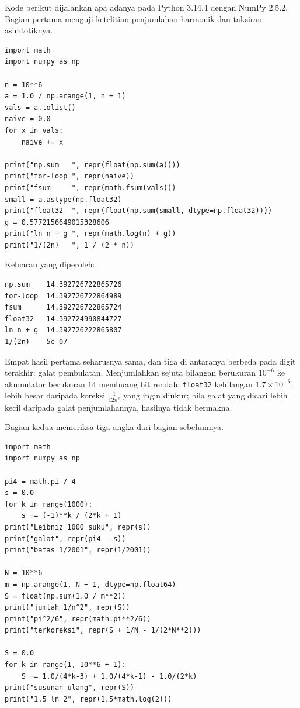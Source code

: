 Kode berikut dijalankan apa adanya pada Python 3.14.4 dengan NumPy 2.5.2. Bagian pertama
menguji ketelitian penjumlahan harmonik dan taksiran asimtotiknya.

\begin{lab}
\begin{verbatim}
import math
import numpy as np

n = 10**6
a = 1.0 / np.arange(1, n + 1)
vals = a.tolist()
naive = 0.0
for x in vals:
    naive += x

print("np.sum   ", repr(float(np.sum(a))))
print("for-loop ", repr(naive))
print("fsum     ", repr(math.fsum(vals)))
small = a.astype(np.float32)
print("float32  ", repr(float(np.sum(small, dtype=np.float32))))
g = 0.5772156649015328606
print("ln n + g ", repr(math.log(n) + g))
print("1/(2n)   ", 1 / (2 * n))
\end{verbatim}
\end{lab}

Keluaran yang diperoleh:
\begin{verbatim}
np.sum    14.392726722865726
for-loop  14.392726722864989
fsum      14.392726722865724
float32   14.392724990844727
ln n + g  14.392726222865807
1/(2n)    5e-07
\end{verbatim}

Empat hasil pertama seharusnya sama, dan tiga di antaranya berbeda pada digit
terakhir: galat pembulatan. Menjumlahkan sejuta bilangan berukuran $10^{-6}$ ke
akumulator berukuran $14$ membuang bit rendah. \texttt{float32} kehilangan
$1.7 \times 10^{-6}$, lebih besar daripada koreksi $\frac{1}{12n^2}$ yang ingin diukur;
bila galat yang dicari lebih kecil daripada galat penjumlahannya, hasilnya tidak
bermakna.

Bagian kedua memeriksa tiga angka dari bagian sebelumnya.

\begin{lab}
\begin{verbatim}
import math
import numpy as np

pi4 = math.pi / 4
s = 0.0
for k in range(1000):
    s += (-1)**k / (2*k + 1)
print("Leibniz 1000 suku", repr(s))
print("galat", repr(pi4 - s))
print("batas 1/2001", repr(1/2001))

N = 10**6
m = np.arange(1, N + 1, dtype=np.float64)
S = float(np.sum(1.0 / m**2))
print("jumlah 1/n^2", repr(S))
print("pi^2/6", repr(math.pi**2/6))
print("terkoreksi", repr(S + 1/N - 1/(2*N**2)))

S = 0.0
for k in range(1, 10**6 + 1):
    S += 1.0/(4*k-3) + 1.0/(4*k-1) - 1.0/(2*k)
print("susunan ulang", repr(S))
print("1.5 ln 2", repr(1.5*math.log(2)))
\end{verbatim}
\end{lab}


